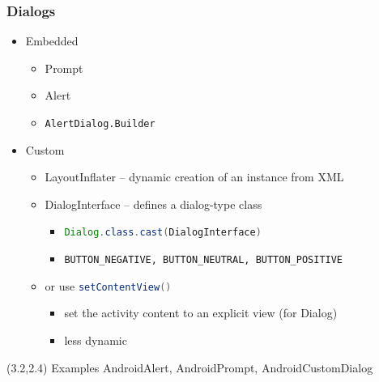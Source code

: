 \documentclass[10pt,xcolor=pdflatex]{beamer}
\newcommand{\inlinejava}{\lstinline[language={Java},basicstyle=\ttfamily,keepspaces]}
\begin{document}
\begin{frame}[fragile]\frametitle{Dialogs}
	\begin{itemize}
		\item Embedded
          \begin{itemize}
        	\item Prompt
        	\item Alert
            \item[] \texttt{AlertDialog.Builder}
          \end{itemize}
		\item Custom
          \begin{itemize}
        	\item LayoutInflater -- dynamic creation of an instance from XML
        	\item DialogInterface -- defines a dialog-type class
              \begin{itemize}
            	\item \inlinejava{Dialog.class.cast(DialogInterface)}
                \item \texttt{BUTTON\_NEGATIVE, BUTTON\_NEUTRAL, BUTTON\_POSITIVE}
              \end{itemize}
			\item or use \inlinejava{setContentView()}
              \begin{itemize}
            	\item set the activity content to an explicit view (for Dialog)
                \item less dynamic
              \end{itemize}
          \end{itemize}
	\end{itemize}
\begin{textblock}{15}(3.2,2.4)
    {\footnotesize Examples AndroidAlert, AndroidPrompt, AndroidCustomDialog}
\end{textblock}
\end{frame}
\end{document}
